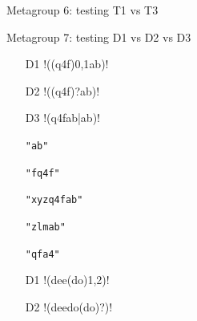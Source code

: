 \begin{footnotesize}
Metagroup 6: testing T1 vs T3
\vspace{-5mm}
\begin{multicols}{3}
\begin{itemize}[noitemsep,topsep=0pt]
\item[T1] \cverb!(\$\{)\d+(:[^}]+\})!
\item[T3] \cverb!([$][{])\d+(:[^}]+[}])!
\item[] \verb|"${881:}"|
\item[] \verb|"{12:-}"|
\item[] \verb|"${09.1::}"|
\item[] \verb|"${31:13}"|
\item[] \verb|"#${1:x22}"|
\item[T1] \cverb!t\.\$+\d+\*!
\item[T3] \cverb!t[.][$]+\d+[*]!
\item[] \verb|"t..5*"|
\item[] \verb|"ampty.*$0"|
\item[] \verb|"sit."|
\item[] \verb|"t.$111*"|
\item[] \verb|"qt.$$$41*"|
\item[T1] \cverb!\{\$(\d+\.\d)\}!
\item[T3] \cverb![{][$](\d+[.]\d)[}]!
\item[] \verb|"{$88.\}"|
\item[] \verb|"{$0.3}"|
\item[] \verb|"$99.2"|
\item[] \verb|"{$31.13}"|
\item[] \verb|"{$112.4}"|
\end{itemize}
\end{multicols}
Metagroup 7: testing D1 vs D2 vs D3
\vspace{-5mm}
\begin{multicols}{2}
\begin{itemize}[noitemsep,topsep=0pt]
\item[D1] \cverb!((q4f){0,1}ab)!
\item[D2] \cverb!((q4f)?ab)!
\item[D3] \cverb!(q4fab|ab)!
\item[] \verb|"ab"|
\item[] \verb|"fq4f"|
\item[] \verb|"xyzq4fab"|
\item[] \verb|"zlmab"|
\item[] \verb|"qfa4"|
\item[D1] \cverb!(dee(do){1,2})!
\item[D2] \cverb!(deedo(do)?)!

\end{itemize}
\end{multicols}
\end{footnotesize}
